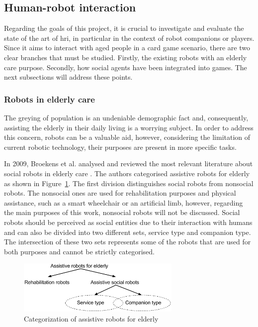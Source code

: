 \subsection{Human-robot interaction}

Regarding the goals of this project, it is crucial to investigate and evaluate the state of the art of \gls{hri}, in particular in the context of robot companions or players.
Since it aims to interact with aged people in a card game scenario, there are two clear branches that must be studied.
Firstly, the existing robots with an elderly care purpose.
Secondly, how social agents have been integrated into games.
The next subsections will address these points.



\subsubsection{Robots in elderly care}

The greying of population is an undeniable demographic fact and, consequently, assisting the elderly in their daily living is a worrying subject.
In order to address this concern, robots can be a valuable aid, however, considering the limitation of current robotic technology, their purposes are present in more specific tasks.


In 2009, Broekens et al. analysed and reviewed the most relevant literature about social robots in elderly care \cite{Broekens2009}.
The authors categorised assistive robots for elderly as shown in Figure~\ref{fig:categorization}.
The first division distinguishes social robots from nonsocial robots.
The nonsocial ones are used for rehabilitation purposes and physical assistance, such as a smart wheelchair or an artificial limb, however, regarding the main purposes of this work, nonsocial robots will not be discussed.
Social robots should be perceived as social entities due to their interaction with humans and can also be divided into two different sets, service type and companion type.
The intersection of these two sets represents some of the robots that are used for both purposes and cannot be strictly categorised.

\begin{figure}[h!]
  \centering
    \includegraphics[width=0.7\textwidth]{./img/categorization_robots}
  \caption{Categorization of assistive robots for elderly}
\label{fig:categorization}
\end{figure}

